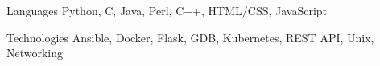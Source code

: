 

\begin{cvskills}

  \cvskill
    {Languages} %
    {Python, C, Java, Perl, C++, HTML/CSS, JavaScript} %

  \cvskill
    {Technologies} %
    {Ansible, Docker, Flask, GDB, Kubernetes, REST API, Unix, Networking} %

\end{cvskills}
